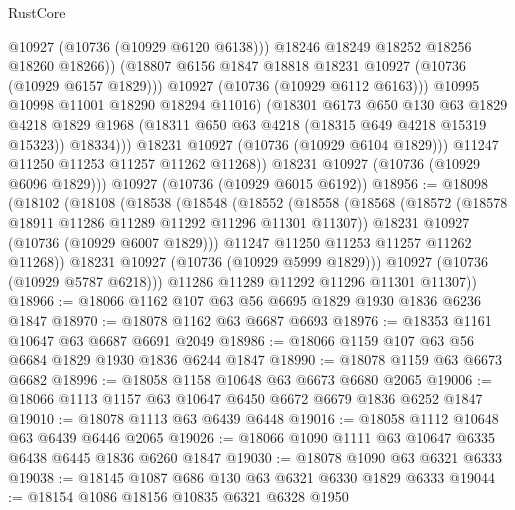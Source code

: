 \begin{lexlean}{RustCore}
\begin{coremodule}
                          @10927
                          (@10736 (@10929 @6120 @6138)))
                        @18246
                        @18249
                        @18252
                        @18256
                        @18260
                        @18266))
                    (@18807 @6156 @1847 @18818 @18231 @10927 (@10736 (@10929 @6157 @1829)))
                    @10927
                    (@10736 (@10929 @6112 @6163)))
                  @10995
                  @10998
                  @11001
                  @18290
                  @18294
                  @11016)
                (@18301
                  @6173
                  @650
                  @130
                  @63
                  @1829
                  @4218
                  @1829
                  @1968
                  (@18311 @650 @63 @4218 (@18315 @649 @4218 @15319 @15323))
                  @18334)))
            @18231
            @10927
            (@10736 (@10929 @6104 @1829)))
          @11247
          @11250
          @11253
          @11257
          @11262
          @11268))
      @18231
      @10927
      (@10736 (@10929 @6096 @1829)))
    @10927
    (@10736 (@10929 @6015 @6192))
@18956 := @18098
    (@18102
      (@18108
        (@18538
          (@18548
            (@18552
              (@18558
                (@18568
                  (@18572 (@18578 @18911 @11286 @11289 @11292 @11296 @11301 @11307))
                  @18231
                  @10927
                  (@10736 (@10929 @6007 @1829)))
                @11247
                @11250
                @11253
                @11257
                @11262
                @11268))
            @18231
            @10927
            (@10736 (@10929 @5999 @1829)))
          @10927
          (@10736 (@10929 @5787 @6218)))
        @11286
        @11289
        @11292
        @11296
        @11301
        @11307))
@18966 := @18066 @1162 @107 @63 @56 @6695 @1829 @1930 @1836 @6236 @1847
@18970 := @18078 @1162 @63 @6687 @6693
@18976 := @18353 @1161 @10647 @63 @6687 @6691 @2049
@18986 := @18066 @1159 @107 @63 @56 @6684 @1829 @1930 @1836 @6244 @1847
@18990 := @18078 @1159 @63 @6673 @6682
@18996 := @18058 @1158 @10648 @63 @6673 @6680 @2065
@19006 := @18066 @1113 @1157 @63 @10647 @6450 @6672 @6679 @1836 @6252 @1847
@19010 := @18078 @1113 @63 @6439 @6448
@19016 := @18058 @1112 @10648 @63 @6439 @6446 @2065
@19026 := @18066 @1090 @1111 @63 @10647 @6335 @6438 @6445 @1836 @6260 @1847
@19030 := @18078 @1090 @63 @6321 @6333
@19038 := @18145 @1087 @686 @130 @63 @6321 @6330 @1829 @6333
@19044 := @18154 @1086 @18156 @10835 @6321 @6328 @1950

\end{coremodule}
\end{lexlean}
